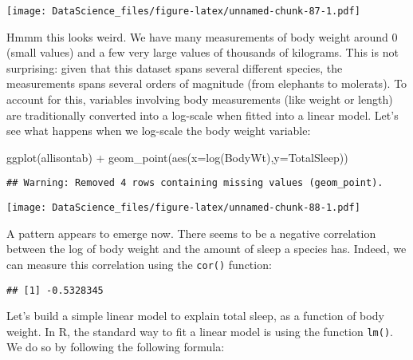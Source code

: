 \documentclass[
]{book}
\newenvironment{Shaded}{\begin{snugshade}}{\end{snugshade}}
\newcommand{\AttributeTok}[1]{\textcolor[rgb]{0.77,0.63,0.00}{#1}}
\newcommand{\FunctionTok}[1]{\textcolor[rgb]{0.00,0.00,0.00}{#1}}
\newcommand{\NormalTok}[1]{#1}
\newcommand{\SpecialCharTok}[1]{\textcolor[rgb]{0.00,0.00,0.00}{#1}}
\newcommand{\StringTok}[1]{\textcolor[rgb]{0.31,0.60,0.02}{#1}}
\begin{document}
\texttt{[image: DataScience\_files/figure-latex/unnamed-chunk-87-1.pdf]}

Hmmm this looks weird. We have many measurements of body weight around 0 (small values) and a few very large values of thousands of kilograms. This is not surprising: given that this dataset spans several different species, the measurements spans several orders of magnitude (from elephants to molerats). To account for this, variables involving body measurements (like weight or length) are traditionally converted into a log-scale when fitted into a linear model. Let's see what happens when we log-scale the body weight variable:

\begin{Shaded}
\begin{Highlighting}[]
\FunctionTok{ggplot}\NormalTok{(allisontab) }\SpecialCharTok{+} \FunctionTok{geom\_point}\NormalTok{(}\FunctionTok{aes}\NormalTok{(}\AttributeTok{x=}\FunctionTok{log}\NormalTok{(BodyWt),}\AttributeTok{y=}\NormalTok{TotalSleep))}
\end{Highlighting}
\end{Shaded}

\begin{verbatim}
## Warning: Removed 4 rows containing missing values (geom_point).
\end{verbatim}

\texttt{[image: DataScience\_files/figure-latex/unnamed-chunk-88-1.pdf]}

A pattern appears to emerge now. There seems to be a negative correlation between the log of body weight and the amount of sleep a species has. Indeed, we can measure this correlation using the \texttt{cor()} function:

\begin{Shaded}
\end{Shaded}

\begin{verbatim}
## [1] -0.5328345
\end{verbatim}

Let's build a simple linear model to explain total sleep, as a function of body weight. In R, the standard way to fit a linear model is using the function \texttt{lm()}. We do so by following the following formula:
\end{document}
